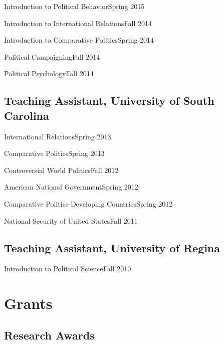 \documentclass[10.5pt,]{article}
\providecommand{\tightlist}{%
  \setlength{\itemsep}{0pt}\setlength{\parskip}{0pt}}
\renewenvironment{itemize}{
  \begin{list}{}{
    \setlength{\leftmargin}{1.5em}
  }
}{
  \end{list}
}
\begin{document}
\begin{itemize}
\tightlist
\item
  Introduction to Political Behavior\hfill Spring 2015
\item
  Introduction to International Relations\hfill Fall 2014
\item
  Introduction to Comparative Politics\hfill Spring 2014
\item
  Political Campaigning\hfill Fall 2014
\item
  Political Psychology\hfill Fall 2014
\end{itemize}

\subsection{Teaching Assistant, University of South
Carolina}\label{teaching-assistant-university-of-south-carolina}

\begin{itemize}
\tightlist
\item
  International Relations\hfill Spring 2013
\item
  Comparative Politics\hfill Spring 2013
\item
  Controversial World Politics\hfill Fall 2012
\item
  American National Government\hfill Spring 2012
\item
  Comparative Politics-Developing Countries\hfill Spring 2012
\item
  National Security of United States\hfill Fall 2011
\end{itemize}

\subsection{Teaching Assistant, University of
Regina}\label{teaching-assistant-university-of-regina}

\begin{itemize}
\tightlist
\item
  Introduction to Political Science\hfill Fall 2010
\end{itemize}

\section{Grants}\label{grants}

\subsection{Research Awards}\label{research-awards}
\end{document}
